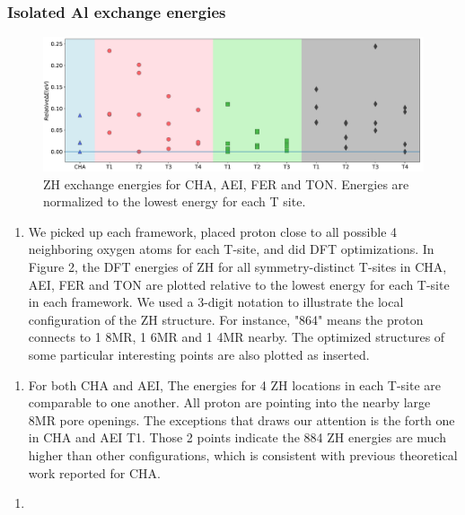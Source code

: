 \documentclass[12pt]{article}
\begin{document}
\subsubsection*{Isolated Al exchange energies}
\begin{figure}[H]
\centering
  \includegraphics[width=5.2in]{./Figures/Figure-2}
  \caption{ZH exchange energies for CHA, AEI, FER and TON. Energies are normalized to the lowest energy for each T site.}
  \label{ZH energies}
\end{figure}

\begin{enumerate}
\item We picked up each framework, placed proton close to all possible 4 neighboring oxygen atoms for each T-site, and did DFT optimizations. In Figure 2, the DFT energies of ZH for all symmetry-distinct T-sites in CHA, AEI, FER and TON are plotted relative to the lowest energy for each T-site in each framework. We used a 3-digit notation to illustrate the local configuration of the ZH structure. For instance, "864" means the proton connects to 1 8MR, 1 6MR and 1 4MR nearby. The optimized structures of some particular interesting points are also plotted as inserted.
\end{enumerate}

\begin{enumerate}[resume]
\item For both CHA and AEI, The energies for 4 ZH locations in each T-site are comparable to one another. All proton are pointing into the nearby large 8MR pore openings. The exceptions that draws our attention is the forth one in CHA and AEI T1. Those 2 points indicate the 884 ZH energies are much higher than other configurations, which is consistent with previous theoretical work reported for CHA.\citep{Li2018JPCC}
\end{enumerate}

\begin{enumerate}[resume]
\item
\end{enumerate}
\end{document}
